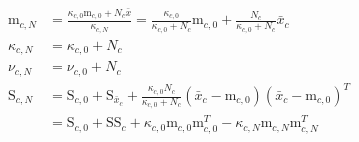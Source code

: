 \documentclass[
  11pt,
  man,floatsintext]{apa6}
\begin{document}
\begin{equation}\label{eq:niw-updating-parameters}
\begin{split}
\mathrm{m}_{c,N} & = \frac{\kappa_{c,0} \mathrm{m}_{c,0} + N_c \bar{x}}{\kappa_{c,N}} = \frac{\kappa_{c,0}}{\kappa_{c,0} + N_c} \mathrm{m}_{c,0} + \frac{N_c}{\kappa_{c,0} + N_c}\bar{x}_c \\
\kappa_{c,N} & = \kappa_{c,0} + N_c \\
\nu_{c,N} & = \nu_{c,0} + N_c \\
\mathrm{S}_{c,N} & = \mathrm{S}_{c,0} + \mathrm{S}_{\bar{x}_c} + \frac{\kappa_{c,0} N_c}{\kappa_{c,0} + N_c}\left( \bar{x}_c-\mathrm{m}_{c,0} \right) \left( \bar{x}_c-\mathrm{m}_{c,0} \right)^T \\
 & = \mathrm{S}_{c,0} + \mathrm{SS}_c + \kappa_{c,0} \mathrm{m}_{c,0} \mathrm{m}_{c,0}^T - \kappa_{c,N} \mathrm{m}_{c,N} \mathrm{m}_{c,N}^T
\end{split}
\end{equation}
\end{document}
